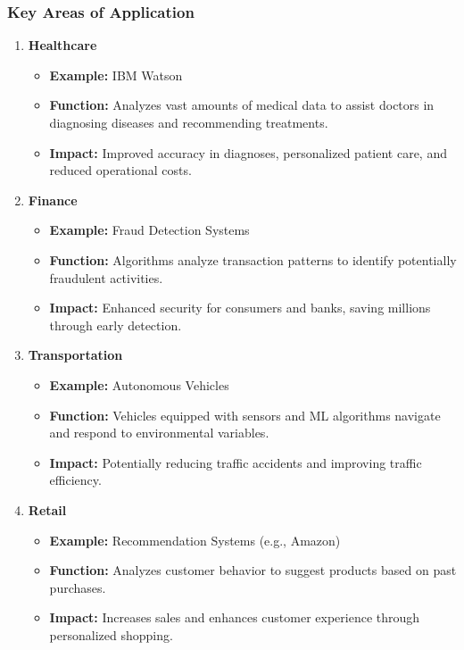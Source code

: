 \documentclass[aspectratio=169]{beamer}
\begin{document}
\begin{frame}[fragile]
    \frametitle{Key Areas of Application}
    \begin{enumerate}
        \item \textbf{Healthcare}
            \begin{itemize}
                \item \textbf{Example:} IBM Watson
                \item \textbf{Function:} Analyzes vast amounts of medical data to assist doctors in diagnosing diseases and recommending treatments.
                \item \textbf{Impact:} Improved accuracy in diagnoses, personalized patient care, and reduced operational costs.
            \end{itemize}
        \item \textbf{Finance}
            \begin{itemize}
                \item \textbf{Example:} Fraud Detection Systems
                \item \textbf{Function:} Algorithms analyze transaction patterns to identify potentially fraudulent activities.
                \item \textbf{Impact:} Enhanced security for consumers and banks, saving millions through early detection.
            \end{itemize}
        \item \textbf{Transportation}
            \begin{itemize}
                \item \textbf{Example:} Autonomous Vehicles
                \item \textbf{Function:} Vehicles equipped with sensors and ML algorithms navigate and respond to environmental variables.
                \item \textbf{Impact:} Potentially reducing traffic accidents and improving traffic efficiency.
            \end{itemize}
        \item \textbf{Retail}
            \begin{itemize}
                \item \textbf{Example:} Recommendation Systems (e.g., Amazon)
                \item \textbf{Function:} Analyzes customer behavior to suggest products based on past purchases.
                \item \textbf{Impact:} Increases sales and enhances customer experience through personalized shopping.
            \end{itemize}
    \end{enumerate}
\end{frame}
\end{document}
